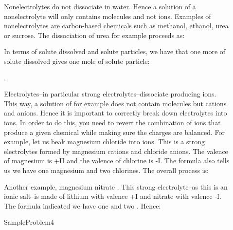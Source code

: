 \documentclass[main.tex]{subfiles}
\newcommand\chapterlabel{Ch-solutions}\setcounter{figurenewcounter}{0}\setcounter{tablenewcounter}{0}\setcounter{formulanewcounter}{0}
\begin{document}
\begin{description}
\item[] Nonelectrolytes do not dissociate in water. Hence a solution of a nonelectrolyte will only contains molecules and not ions. Examples of nonelectrolytes are carbon-based chemicals such as methanol, ethanol, urea or sucrose. The dissociation of urea for example  proceeds as:
\begin{center}\end{center}
In terms of solute dissolved and solute particles, we have that one more of solute dissolved gives one mole of solute particle:
\begin{center}.\end{center}
\item[] Electrolytes--in particular strong electrolytes--dissociate producing ions. This way, a solution of for example  does not contain  molecules but  cations and  anions. Hence it is important to  correctly break down electrolytes into ions. In order to do this, you need to revert the combination of ions that produce a given chemical while making sure the charges are balanced. For example, let us beak magnesium chloride  into ions. This is a strong electrolytes formed by magnesium cations and chloride anions. The valence of magnesium is +II and the valence of chlorine is -I. The  formula also tells us we have one magnesium and two chlorines. The overall process is:
\begin{center}\end{center}
Another example, magnesium nitrate . This strong electrolyte--as this is an ionic salt--is made of lithium with valence +I and nitrate with valence -I. The formula indicated we have one  and two . Hence:
\begin{center}\end{center}

{SampleProblem4}





\end{description}
\end{document}
